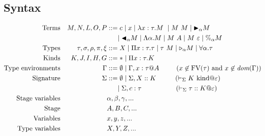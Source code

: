 \subsection{Syntax}

\begin{align*}
	\textrm{Terms}             &  & M,N,L,O,P                & ::= c \mid x \mid \lambda x:\tau.M\ \mid M\ M \mid \TB_\alpha M                                                                                    \\
	                           &  &                          & \ \ \ \ \mid \TBL_\alpha M \mid \Lambda\alpha.M \mid M\ A \mid M\ \varepsilon \mid \%_\alpha M                                                                       \\
	\textrm{Types}             &  & \tau,\sigma,\rho,\pi,\xi & ::= X \mid \Pi x:\tau.\tau \mid \tau\ M \mid \TW_{\alpha} M \mid \F\alpha.\tau                                                                     \\
	\textrm{Kinds}             &  & K,J,I,H,G                & ::= * \mid \Pi x:\tau.K                                                                                                                            \\
	\textrm{Type environments} &  & \Gamma                   & ::= \emptyset \mid \Gamma,x:\tau@A \hspace{9mm} (x\not\in\textrm{FV}(\tau)\ \text{and}\ x\not\in\textit{dom}(\G)) \\
	\textrm{Signature}         &  & \Sigma                   & ::= \emptyset \mid \Sigma,X::K     \hspace{10mm} (\V K \iskind @ \varepsilon)                                      \\
	                           &  &                          & \ \ \ \ \mid \Sigma,c:\tau         \hspace{18mm} (\V \tau :: K @ \varepsilon)                                      \\
	\textrm{Stage variables}   &  &                          & \alpha,\beta,\gamma,...                                                                                                                            \\
	\textrm{Stage}             &  &                          & A,B,C,...                                                                                                                                          \\
	\textrm{Variables}         &  &                          & x,y,z,...                                                                                                                                          \\
	\textrm{Type variables}    &  &                          & X,Y,Z,...                                                                                                                                          \\
\end{align*}

